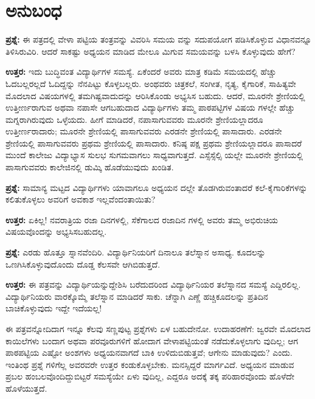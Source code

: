 
\chapter{ಅನುಬಂಧ}

\textbf{ಪ್ರಶ್ನೆ:} ಈ ಪತ್ರದಲ್ಲಿ ವೇಳಾ ಪಟ್ಟಿಯ ತಂತ್ರವನ್ನು ವಿವರಿಸಿ ಸಮಯ ವನ್ನು ಸದುಪಯೋಗ ಪಡಿಸಿಕೊಳ್ಳುವ ವಿಧಾನವನ್ನೂ ತಿಳಿಸಿರುವಿರಿ. ಆದರೆ ಸಾಕಷ್ಟು ಅಧ್ಯಯನ ಮಾಡಿದ ಮೇಲೂ ಮಿಗುವ ಸಮಯವನ್ನು ಬಳಸಿ ಕೊಳ್ಳುವುದು ಹೇಗೆ?

\textbf{ಉತ್ತರ:} ಇದು ಬುದ್ಧಿವಂತ ವಿದ್ಯಾರ್ಥಿಗಳ ಸಮಸ್ಯೆ. ಏಕೆಂದರೆ ಅವರು ಮಾತ್ರ ಕಡಿಮೆ ಸಮಯದಲ್ಲಿ ಹೆಚ್ಚು ಓದಬಲ್ಲರಲ್ಲದೆ ಓದಿದ್ದನ್ನು ನೆನಪಿಟ್ಟು ಕೊಳ್ಳಬಲ್ಲರು. ಅಂಥವರು ಚಿತ್ರಕಲೆ, ಸಂಗೀತ, ನೃತ್ಯ, ಕೈಗಾರಿಕೆ, ಸಾಹಿತ್ಯವೇ ಮೊದಲಾದ ವಿಷಯಗಳಲ್ಲಿ ತಮಗಿಷ್ಟವಾದುದನ್ನು ಆರಿಸಿಕೊಂಡು ಅಭ್ಯಸಿಸ ಬಹುದು. ಆದರೆ, ಮೂರನೇ ಶ್ರೇಣಿಯಲ್ಲಿ ಉತ್ತೀರ್ಣರಾಗುವ ಅಥವಾ ನಪಾಸೇ ಆಗಬಹುದಾದ ವಿದ್ಯಾರ್ಥಿಗಳು ತಮ್ಮ ಪಾಠಪಟ್ಟಿಗಳ ವಿಷಯ ಗಳಲ್ಲೇ ಹೆಚ್ಚು ಮಗ್ನರಾಗಿರುವುದು ಒಳ್ಳೆಯದು. ಹೀಗೆ ಮಾಡಿದರೆ, ನಪಾಸಾಗುವವರು ಮೂರನೇ ಶ್ರೇಣಿಯಲ್ಲಾದರೂ ಉತ್ತೀರ್ಣರಾದಾರು; ಮೂರನೇ ಶ್ರೇಣಿಯಲ್ಲಿ ಪಾಸಾಗುವವರು ಎರಡನೇ ಶ್ರೇಣಿಯಲ್ಲಿ ಪಾಸಾದಾರು. ಎರಡನೇ ಶ್ರೇಣಿಯಲ್ಲಿ ಪಾಸಾಗುವವರು ಪ್ರಥಮ ಶ್ರೇಣಿಯಲ್ಲಿ ಪಾಸಾದಾರು. ಕನಿಷ್ಠ ಪಕ್ಷ ಪ್ರಥಮ ಶ್ರೇಣಿಯಲ್ಲಾದರೂ ಪಾಸಾದರೆ ಮುಂದೆ ಕಾಲೇಜು ವಿದ್ಯಾಭ್ಯಾಸ ಸುಲಭ ಸುಗಮವಾಗಲು ಸಾಧ್ಯವಾಗುತ್ತದೆ. ಎಸ್ಸೆಸ್ಸೆಲ್ಸಿ ಯಲ್ಲೇ ಮೂರನೇ ಶ್ರೇಣಿಯಲ್ಲಿ ಪಾಸಾಗುವವರು ಕಾಲೇಜಿನಲ್ಲಿ ಡುಮ್ಕಿ ಹೊಡೆಯುವುದು ಖಂಡಿತ.

\textbf{ಪ್ರಶ್ನೆ:} ಸಾಮಾನ್ಯ ಮಟ್ಟದ ವಿದ್ಯಾರ್ಥಿಗಳು ಯಾವಾಗಲೂ ಅಧ್ಯಯನ ದಲ್ಲೇ ತೊಡಗಿರುವಂತಾದರೆ ಕಲೆ-ಕೈಗಾರಿಕೆಗಳನ್ನು ಕಲಿತುಕೊಳ್ಳಲು ಅವರಿಗೆ ಅವಕಾಶ ಇಲ್ಲವೆಂದಂತಾಯಿತು?

\textbf{ಉತ್ತರ:} ಏಕಿಲ್ಲ! ನವರಾತ್ರಿಯ ರಜಾ ದಿನಗಳಲ್ಲಿ, ಸೆಕೆಗಾಲದ ರಜಾದಿನ ಗಳಲ್ಲಿ ಅವರು ತಮ್ಮ ಅಭಿರುಚಿಯ ವಿಷಯವೊಂದನ್ನು ಅಭ್ಯಸಿಸಬಹುದಲ್ಲ.

\textbf{ಪ್ರಶ್ನೆ:} ಎರಡು ಹೊತ್ತೂ ಸ್ನಾನವೆಂದಿರಿ. ವಿದ್ಯಾರ್ಥಿನಿಯರಿಗೆ ದಿನಾಲೂ ತಲೆಸ್ನಾನ ಅಸಾಧ್ಯ. ಕೂದಲನ್ನು ಒಣಗಿಸಿಕೊಳ್ಳುವುದೊಂದು ದೊಡ್ಡ ಕೆಲಸವೇ ಆಗಿಬಿಡುತ್ತದೆ.

\textbf{ಉತ್ತರ:} ಈ ಪತ್ರವನ್ನು ವಿದ್ಯಾರ್ಥಿಯನ್ನುದ್ದೇಶಿಸಿ ಬರೆದುದರಿಂದ ವಿದ್ಯಾರ್ಥಿನಿಯರ ತಲೆಸ್ನಾನದ ಸಮಸ್ಯೆ ಎದ್ದಿರಲಿಲ್ಲ. ವಿದ್ಯಾರ್ಥಿನಿಯರು ವಾರಕ್ಕೊಮ್ಮೆ ತಲೆಸ್ನಾನ ಮಾಡಿದರೆ ಸಾಕು. ಚೆನ್ನಾಗಿ ಎಣ್ಣೆ ಹಚ್ಚಿಕೂದಲನ್ನು ಪ್ರತಿದಿನ ಬಾಚಿಕೊಳ್ಳುವುದು ಇದ್ದೇ ಇದೆಯಲ್ಲ!

\delimiter

ಈ ಪತ್ರವನ್ನೋದಿದಾಗ ಇನ್ನೂ ಕೆಲವು ಸಣ್ಣಪುಟ್ಟ ಪ್ರಶ್ನೆಗಳು ಏಳ ಬಹುದೇನೋ. ಉದಾಹರಣೆಗೆ: ಜ್ವರವೇ ಮೊದಲಾದ ಕಾಯಿಲೆಗಳು ಬಂದಾಗ ಅಥವಾ ಪರವೂರುಗಳಿಗೆ ಹೋದಾಗ ವೇಳಾಪಟ್ಟಿಯಂತೆ ನಡೆದುಕೊಳ್ಳಲಾಗು ವುದಿಲ್ಲ; ಆಗ ಪಾಠಪಟ್ಟಿಯ ಎಷ್ಟೋ ಅಂಶಗಳು ಅಧ್ಯಯನವಾಗದೆ ಬಾಕಿ ಉಳಿದುಬಿಡುತ್ತವೆ; ಆಗೇನು ಮಾಡುವುದು? ಎಂದು. ಇಂತಿಂಥ ಪ್ರಶ್ನೆ ಗಳಿಗೆಲ್ಲ ಅವರವರೇ ಉತ್ತರ ಕಂಡುಕೊಳ್ಳಬೇಕು. ಮನಸ್ಸಿದ್ದರೆ ಮಾರ್ಗವಿದೆ. ಅಧ್ಯಯನ ಮಾಡುವ ಪ್ರಬಲ ಹಂಬಲವೊಂದಿದ್ದುಬಿಟ್ಟರೆ ಸಮಸ್ಯೆಯೇ ಏಳು ವುದಿಲ್ಲ, ಎದ್ದರೂ ಅದಕ್ಕೆ ತಕ್ಕ ಪರಿಹಾರವೊಂದು ಹೊಳೆದೇ ಹೊಳೆಯುತ್ತದೆ.

\delimiter

